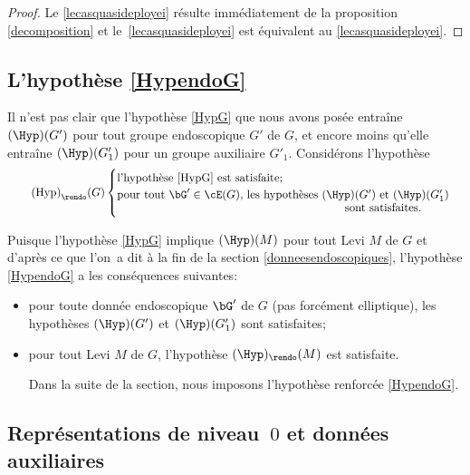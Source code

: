 \begin{proof}
Le \eqref{lecasquasideployei} résulte immédiatement de la proposition \ref{decomposition} et le~\eqref{lecasquasideployei} est équivalent au \eqref{lecasquasideployei}.
\end{proof}

\subsection{L'hypothèse \texorpdfstring{\ref{HypendoG}}{Hyp}}\label{Hypendo}

Il n'est pas clair que l'hypothèse \ref{HypG} que nous avons posée entraîne $(\Hyp)(G')$ pour tout groupe endoscopique $G'$ de $G$, et encore moins qu'elle entraîne $(\Hyp)(G'_{1})$ pour un groupe auxiliaire $G'_{1}$. Considérons l'hypothèse\vspace*{-6pt}
\begin{equation}\tag*{$\textup{(Hyp)}_\rendo(G)$}\label{HypendoG} \begin{cases}
\text{l'hypothèse \ref{HypG} est satisfaite;}\\
\text{pour tout $\bG'\in \cE(G)$, les hypothèses $(\Hyp)(G')$ et $(\Hyp)(G'_{1})$}\\[-3pt]
\hspace*{7cm}\text{sont satisfaites.}
\end{cases}
\end{equation}

Puisque l'hypothèse \ref{HypG} implique $(\Hyp)(M)$ pour tout Levi $M$ de $G$ et d'après ce que l'on~a dit à la fin de la section \ref{donneesendoscopiques}, l'hypothèse \ref{HypendoG} a les conséquences suivantes:
\begin{itemize}
\item
pour toute donnée endoscopique $\bG'$ de $G$ (pas forcément elliptique), les hypothèses $(\Hyp)(G')$ et $(\Hyp)(G'_{1})$ sont satisfaites;

\item
pour tout Levi $M$ de $G$, l'hypothèse $(\Hyp)_{\rendo}(M)$ est satisfaite.

\smallskip
\noindent
Dans la suite de la section, nous imposons l'hypothèse renforcée \ref{HypendoG}.
\end{itemize}


\subsection{Représentations de niveau~\texorpdfstring{$0$}{0} et données auxiliaires}\label{representationsetdonnees}

